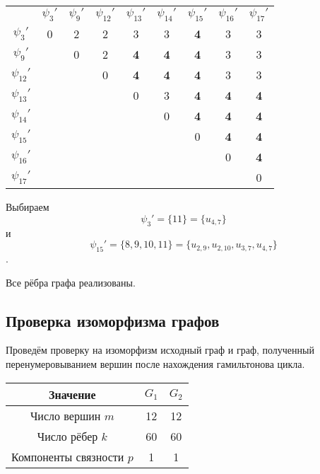 \documentclass[12pt, a4paper] {ncc}
\begin{document}
\begin{tabular}{c|c c c c c c c c}
\hline %
		   & $\psi_3'$ & $\psi_9'$ & $\psi_{12}'$& $\psi_{13}'$& $\psi_{14}'$& $\psi_{15}'$& $\psi_{16}'$& $\psi_{17}'$ \\
$\psi_3'   $  &0&2&2&3&3&\textbf{4}&3&3 \\
$\psi_9'   $  & &0&2&\textbf{4}&\textbf{4}&\textbf{4}&3&3 \\
$\psi_{12}' $ & & &0&\textbf{4}&\textbf{4}&\textbf{4}&3&3 \\
$\psi_{13}' $ & & & &0&3&\textbf{4}&\textbf{4}&\textbf{4} \\
$\psi_{14}' $ & & & & &0&\textbf{4}&\textbf{4}&\textbf{4} \\
$\psi_{15}' $ & & & & & &0&\textbf{4}&\textbf{4} \\
$\psi_{16}' $ & & & & & & &0&\textbf{4} \\
$\psi_{17}' $ & & & & & & & &0 \\ \hline
\end{tabular}

Выбираем $$\psi_3' = \{ 11 \} = \{ u_{4,7} \}$$ и $$\psi_{15}' = \{ 8, 9, 10, 11\} = \{ u_{2,9}, u_{2,10}, u_{3,7}, u_{4,7}\}$$.

Все рёбра графа реализованы.

\subsection{Проверка изоморфизма графов}

Проведём проверку на изоморфизм исходный граф и граф, полученный
перенумеровыванием вершин после нахождения гамильтонова цикла.

\begin{tabular}{|c|c c|}
\hline
\bf Значение & $G_1$ & $G_2$ \\
\hline
Число вершин $m$         & 12 & 12 \\
Число рёбер $k$          & 60 & 60 \\
Компоненты связности $p$ & 1  & 1 \\
\hline
\end{tabular}
\end{document}

